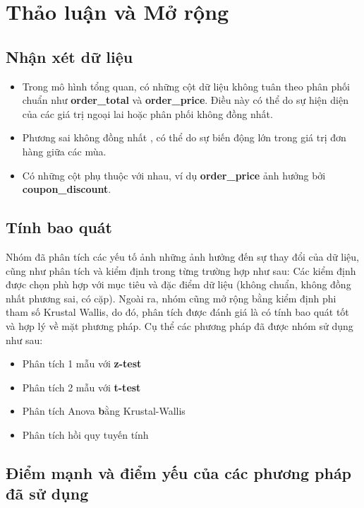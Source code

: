 \vfil{}\vfilneg
\section{Thảo luận và Mở rộng}

\subsection{Nhận xét dữ liệu}
\begin{itemize}
    \item  Trong mô hình tổng quan, có những cột dữ liệu không tuân theo phân phối chuẩn như \textbf{order\_total} và \textbf{order\_price}. Điều này có thể do sự hiện diện của các giá trị ngoại lai hoặc phân phối không đồng nhất.
    \item Phương sai không đồng nhất , có thể do sự biến động lớn trong giá trị đơn hàng giữa các mùa. 
    \item Có những cột phụ thuộc với nhau, ví dụ \textbf{order\_price} ảnh hưởng bởi \textbf{coupon\_discount}.

\end{itemize}

\subsection{Tính bao quát}

Nhóm đã phân tích các yếu tố ảnh những ảnh hưởng đến sự thay đổi của dữ liệu, cũng như phân tích và kiểm định trong từng trường hợp như sau:
Các kiểm định được chọn phù hợp với mục tiêu và đặc điểm dữ liệu (không chuẩn, không đồng nhất phương sai, có cặp). Ngoài ra, nhóm cũng mở rộng bằng kiểm định phi tham số Krustal Wallis, do đó, phân tích được đánh giá là có tính bao quát tốt và hợp lý về mặt phương pháp.
Cụ thể các phương pháp đã được nhóm sử dụng như sau: 
\begin{itemize}
    \item Phân tích 1 mẫu với \textbf{z-test}
    \item Phân tích 2 mẫu với \textbf{t-test}
    \item Phân tích Anova \textbf bằng {Krustal-Wallis}
    \item Phân tích hồi quy tuyến tính
\end{itemize}
\subsection{Điểm mạnh và điểm yếu của các phương pháp đã sử dụng}

